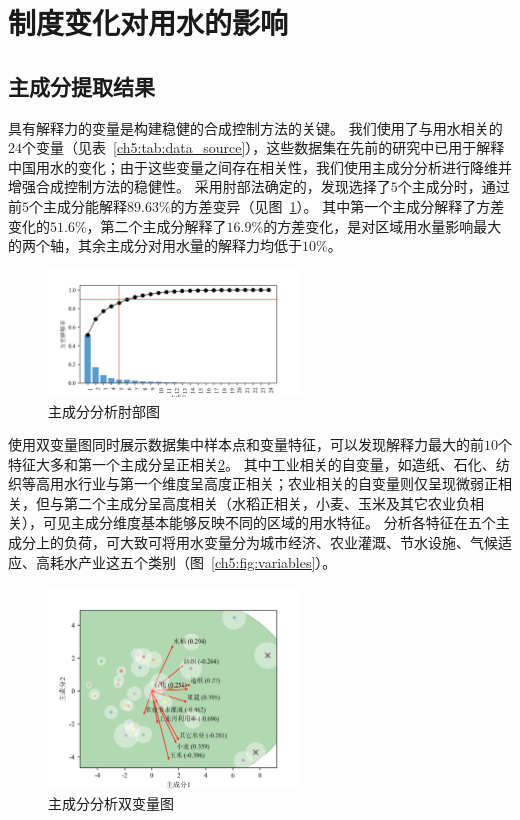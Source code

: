 

\section{制度变化对用水的影响}

\subsection{主成分提取结果}

具有解释力的变量是构建稳健的合成控制方法的关键。
我们使用了与用水相关的$24$个变量（见表~\ref{ch5:tab:data_source}），这些数据集在先前的研究中已用于解释中国用水的变化\cite{zhou2020}；由于这些变量之间存在相关性，我们使用主成分分析进行降维并增强合成控制方法的稳健性。
采用肘部法确定的，发现选择了$5$个主成分时，通过前$5$个主成分能解释$89.63\%$的方差变异（见图~\ref{ch5:fig:elbow}）。
其中第一个主成分解释了方差变化的$51.6\%$，第二个主成分解释了$16.9\%$的方差变化，是对区域用水量影响最大的两个轴，其余主成分对用水量的解释力均低于$10\%$。

\begin{figure}[htb]
    \centering
    \includegraphics[width=0.6\textwidth]{img/ch5/ch5_elbow.png}
    \caption{主成分分析肘部图}\label{ch5:fig:elbow}
\end{figure}

使用双变量图同时展示数据集中样本点和变量特征，可以发现解释力最大的前$10$个特征大多和第一个主成分呈正相关\ref{ch5:fig:biplot}。
其中工业相关的自变量，如造纸、石化、纺织等高用水行业与第一个维度呈高度正相关；农业相关的自变量则仅呈现微弱正相关，但与第二个主成分呈高度相关（水稻正相关，小麦、玉米及其它农业负相关），可见主成分维度基本能够反映不同的区域的用水特征。
分析各特征在五个主成分上的负荷，可大致可将用水变量分为城市经济、农业灌溉、节水设施、气候适应、高耗水产业这五个类别（图~\ref{ch5:fig:variables}）。


\begin{figure}[htb]
    \centering
    \includegraphics[width=0.6\textwidth]{img/ch5/ch5_biplot.png}
    \caption{主成分分析双变量图}\label{ch5:fig:biplot}
\end{figure}


